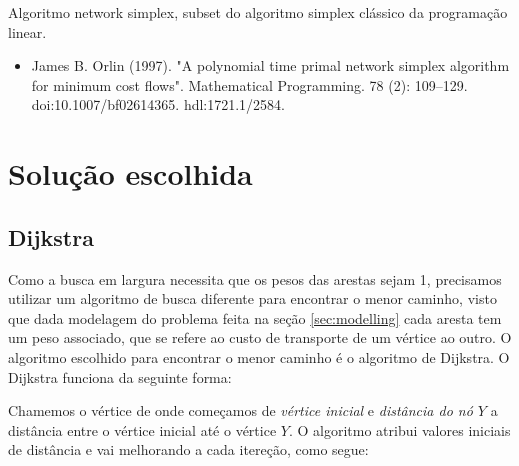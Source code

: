 \documentclass[12pt, a4]{article}
\begin{document}
Algoritmo network simplex, subset do algoritmo simplex clássico da programação
linear.

\begin{itemize}
\item James B. Orlin (1997). "A polynomial time primal network simplex algorithm
  for minimum cost flows". Mathematical Programming. 78 (2): 109–129.
  doi:10.1007/bf02614365. hdl:1721.1/2584.
\end{itemize}

\section{Solução escolhida}
\label{sec:solution}

\subsection{Dijkstra}
\label{subsec:dijkstra}

Como a busca em largura necessita que os pesos das arestas sejam 1, precisamos
utilizar um algoritmo de busca diferente para encontrar o menor caminho, visto
que dada modelagem do problema feita na seção \ref{sec:modelling} cada aresta
tem um peso associado, que se refere ao custo de transporte de um vértice ao
outro. O algoritmo escolhido para encontrar o menor caminho é o algoritmo de
Dijkstra. O Dijkstra funciona da seguinte forma:

Chamemos o vértice de onde começamos de \emph{vértice inicial} e \emph{distância
  do nó $Y$} a distância entre o vértice inicial até o vértice $Y$. O
algoritmo atribui valores iniciais de distância e vai melhorando a cada
itereção, como segue:
\end{document}
